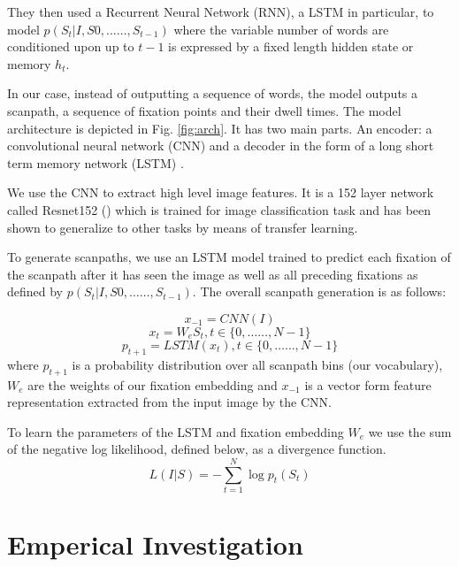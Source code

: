 \documentclass{article} %
\begin{document}
They then used a Recurrent Neural Network (RNN), a LSTM in particular, to model $p(S_t| I, S0,\dots \dots, S_{t-1})$ where the variable number
of words are conditioned upon up to $t- 1$ is expressed by a fixed length hidden state or memory $h_t$.

In our case, instead of outputting a sequence of words, the model outputs a scanpath, a sequence of fixation points and their dwell times. The model architecture is depicted in Fig. \ref{fig:arch}. It has two main parts. An encoder: a convolutional neural network (CNN) and a decoder in the form of a long short term memory network (LSTM) .

We use the CNN to extract high level image features. It is a 152 layer network called Resnet152 (\cite{DBLP:journals/corr/HeZRS15}) which is trained for image classification task and has been shown to generalize to other tasks by means of transfer learning. %

To generate scanpaths, we use an LSTM model trained to predict each
fixation of the scanpath after it has seen the image as well
as all preceding fixations as defined by $p(S_t| I, S0,\dots \dots, S_{t-1})$. The overall scanpath generation is as follows:

$$x_{-1} = CNN(I)$$
$$x_{t} = W_eS_t, t\in\{0, \dots \dots, N-1\}$$
$$p_{t+1} = LSTM(x_t), t\in\{0, \dots \dots, N-1\}$$
where $p_{t+1}$ is a probability distribution over all scanpath bins (our vocabulary), $W_e$ are the weights of our fixation embedding and $x_{-1}$ is a vector form feature representation extracted from the input image by the CNN.

To learn the parameters of the LSTM and fixation embedding $W_e$ we use   the sum of the negative log likelihood, defined below, as a divergence function.
\begin{equation}
 L(I|S) = -\sum_{t=1}^{N} \log p_{t}(S_t)    
\end{equation}

\section{Emperical Investigation}
\end{document}
